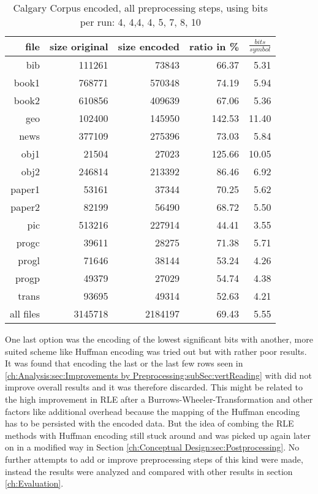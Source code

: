 {{\begin{table}[H]
	\centering
	\begin{tabular}{r|r|r|r|r}	
		file & size original & size encoded & ratio in \% & $\frac{bits}{symbol}$\\
		\hline
bib & 111261 & 73843 & 66.37 & 5.31 \\
book1 & 768771 & 570348 & 74.19 & 5.94 \\
book2 & 610856 & 409639 & 67.06 & 5.36 \\
geo & 102400 & 145950 & 142.53 & 11.40 \\
news & 377109 & 275396 & 73.03 & 5.84 \\
obj1 & 21504 & 27023 & 125.66 & 10.05 \\
obj2 & 246814 & 213392 & 86.46 & 6.92 \\
paper1 & 53161 & 37344 & 70.25 & 5.62 \\
paper2 & 82199 & 56490 & 68.72 & 5.50 \\
pic & 513216 & 227914 & 44.41 & 3.55 \\
progc & 39611 & 28275 & 71.38 & 5.71 \\
progl & 71646 & 38144 & 53.24 & 4.26 \\
progp & 49379 & 27029 & 54.74 & 4.38 \\
trans & 93695 & 49314 & 52.63 & 4.21 \\
		\hline
		all files & 3145718 & 2184197 & 69.43 & 5.55
	\end{tabular}
	\caption{Calgary Corpus encoded, all preprocessing steps, using bits per run: 4, 4,4, 4, 5, 7, 8, 10}
	\label{tab:t5:Calgary Corpus encoded, all preprocessing steps, using bits per run: 4, 4,4, 4, 5, 7, 8, 10}
\end{table}

\par{
One last option was the encoding of the lowest significant bits with another, more suited scheme like Huffman encoding was tried out but with rather poor results. It was found that encoding the last or the last few rows seen in \ref{ch:Analysis:sec:Improvements by Preprocessing:subSec:vertReading} with did not improve overall results and it was therefore discarded. This might be related to the high improvement in RLE after a Burrows-Wheeler-Transformation and other factors like additional overhead because the mapping of the Huffman encoding has to be persisted with the encoded data. But the idea of combing the RLE methods with Huffman encoding still stuck around and was picked up again later on in a modified way in Section \ref{ch:Conceptual Design:sec:Postprocessing}. No further attempts to add or improve preprocessing steps of this kind were made, instead the results were analyzed and compared with other results in section \ref{ch:Evaluation}.
}
}}
